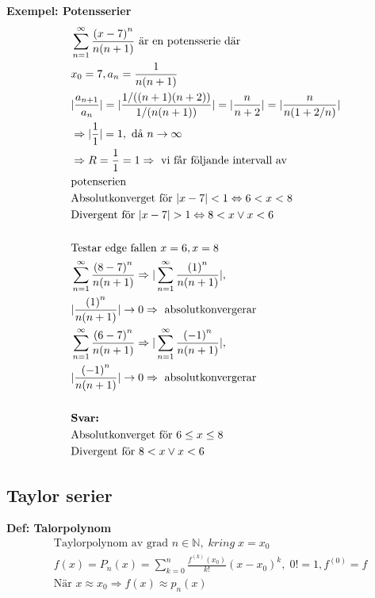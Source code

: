 \begin{multicols}{2}
\textbf{Exempel: Potensserier}
\begin{align*}
  &\displaystyle\sum_{n=1}^{\infty}\frac{{(x-7)}^n}{n(n+1)} \text{ är en potensserie där } \\
  &x_0=7, a_n=\frac{1}{n(n+1)} \\
  &|\frac{a_{n+1}}{a_n}| = |\frac{1/((n+1)(n+2))}{1/(n(n+1))}| = |\frac{n}{n+2}| =
  |\frac{n}{n(1+2/n)}| \\
  &\Rightarrow |\frac{1}{1}| = 1, \text{ då } n \to \infty \\
  &\Rightarrow R=\frac{1}{1}=1 \Rightarrow \text{ vi får följande intervall av} \\
  &\text{potenserien} \\
  &\text{Absolutkonverget för } |x-7|<1 \Leftrightarrow 6<x<8 \\
  &\text{Divergent för } |x-7|>1 \Leftrightarrow 8<x \lor x<6 \\
  &\\
  &\text{Testar edge fallen } x=6, x=8 \\
  &\displaystyle\sum_{n=1}^{\infty}\frac{{(8-7)}^n}{n(n+1)} 
  \Rightarrow |\displaystyle\sum_{n=1}^{\infty}\frac{{(1)}^n}{n(n+1)}|, \\
  &|\frac{{(1)}^n}{n(n+1)}|\to0 \Rightarrow \text{ absolutkonvergerar} \\
  &\displaystyle\sum_{n=1}^{\infty}\frac{{(6-7)}^n}{n(n+1)} 
  \Rightarrow |\displaystyle\sum_{n=1}^{\infty}\frac{{(-1)}^n}{n(n+1)}|, \\
  &|\frac{{(-1)}^n}{n(n+1)}|\to0 \Rightarrow \text{ absolutkonvergerar} \\
  &\\
  &\text{\textbf{Svar:} } \\
  &\text{Absolutkonverget för } 6\leq x\leq 8 \\
  &\text{Divergent för } 8<x \lor x<6 \\
\end{align*}


\subsection{Taylor serier}

\textbf{Def: Talorpolynom}
\begin{align*}
  &\text{Taylorpolynom av grad } n \in \mathbb{N}, \; kring \; x=x_0 \\
  &f(x)=P_n(x)= \displaystyle\sum_{k=0}^{n}\frac{f^{(k)}(x_0)}{k!}{(x-x_0)}^k, \; 0!=1,f^{(0)}=f \\
  &\text{När } x \approx x_0 \Rightarrow f(x) \approx p_n(x) \\
\end{align*}


\end{multicols}
